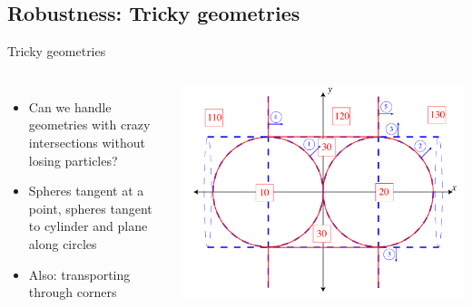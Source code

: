 \documentclass{beamer}
\begin{document}
\subsection{Robustness: Tricky geometries}
\begin{frame}{Tricky geometries}
\begin{columns}[c]
\begin{itemize}
  \item Can we handle geometries with crazy intersections without losing
    particles?
  \item Spheres tangent at a point, spheres tangent to cylinder and plane along
    circles
  \item Also: transporting through corners
\end{itemize}

    \includegraphics[width=\textwidth, keepaspectratio]{tricky_geometry}
\end{columns}
\end{frame}
\end{document}
